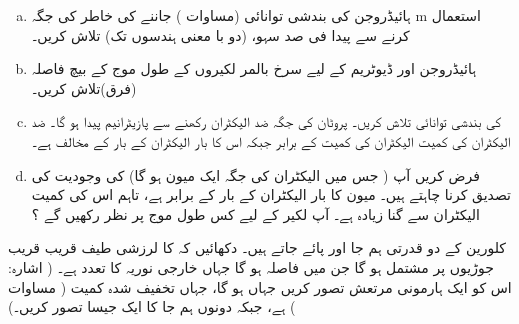 \begin{enumerate}[a.]
\item
 ہائیڈروجن کی بندشی توانائی (مساوات ) جاننے کی خاطر  کی جگہ m استعمال کرنے سے پیدا فی صد سہو، (دو با معنی ہندسوں تک) تلاش کریں۔ 
\item
 ہائیڈروجن اور ڈیوٹریم کے لیے سرخ بالمر لکیروں  کے طول موج کے بیچ فاصلہ (فرق)تلاش کریں۔ 
\item
  کی بندشی توانائی تلاش کریں۔ پروٹان کی جگہ ضد الیکٹران رکھنے سے پازیٹرانیم پیدا ہو گا۔ ضد الیکٹران کی کمیت الیکٹران کی کمیت کے برابر جبکہ اس کا بار الیکٹران کے بار کے مخالف ہے۔ 
\item
 فرض کریں آپ  ( جس میں الیکٹران کی جگہ ایک میون ہو گا) کی وجودیت کی تصدیق کرنا چاہتے ہیں۔ میون کا بار الیکٹران کے بار کے برابر ہے، تاہم اس کی کمیت الیکٹران سے گنا زیادہ ہے۔ آپ  لکیر  کے لیے کس طول موج پر نظر رکھیں گے ؟
\end{enumerate}
کلورین کے دو قدرتی ہم جا  اور  پائے جاتے ہیں۔ دکھائیں کہ  کا لرزشی طیف قریب قریب جوڑیوں پر مشتمل ہو گا جن میں فاصلہ  ہو گا جہاں  خارجی نوریہ کا تعدد ہے۔ ( اشارہ: اس کو ایک ہارمونی مرتعش تصور کریں
 جہاں  ہو گا، جہاں  تخفیف شدہ کمیت ( مساوات  ) ہے، جبکہ دونوں ہم جا کا  ایک جیسا تصور کریں۔) 


